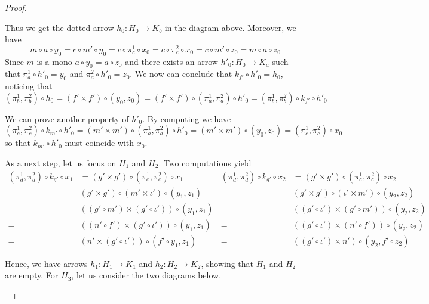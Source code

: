 \documentclass[a4paper,UKenglish,cleveref,pdftex,thm-restate,numberwithinsect]{lipics-v2021}
\begin{document}
\begin{proof}
\begin{enumerate}
 Thus we get the dotted arrow $h_0\colon H_0\to K_b$ in the diagram above. Moreover, we have
 \[m\circ a\circ y_0=c\circ m'\circ y_0=c\circ \pi^1_c\circ x_0=c\circ \pi^2_c\circ x_0=c\circ m'\circ z_0=m\circ a \circ z_0\]
 Since $m$ is a mono $a\circ y_0=a\circ z_0$ and there exists an arrow $h'_0\colon H_0\to K_a$ such that $\pi^1_a\circ h'_0=y_0$ and $\pi^2_a\circ h'_0=z_0$. 
 We now can conclude that $k_{f'}\circ h'_0=h_0$, noticing that
 \[(\pi^1_b, \pi^2_b)\circ h_0=(f'\times f')\circ (y_0, z_0)=(f'\times f')\circ (\pi^1_a, \pi^2_a)\circ h'_0=(\pi^1_b, \pi^2_b)\circ k_{f'}\circ h'_0\]

We can prove another property of $h'_0$. By computing we have
\[(\pi^1_c, \pi^2_c)\circ k_{m'}\circ h'_0=(m'\times m')\circ (\pi^1_a, \pi^2_a)\circ h'_0=(m'\times m')\circ (y_0, z_0)=(\pi^1_c, \pi^2_c)\circ x_0\]
so that $k_{m'}\circ h'_0$ must coincide with $x_0$.

As a next step, let us focus on $H_1$ and $H_2$. Two computations yield \small
 \[\begin{split}
(\pi^1_d, \pi^2_d)\circ k_{g'}\circ x_1&=(g'\times g')\circ (\pi^1_c, \pi^2_c)\circ x_1\\=&(g'\times g')\circ (m'\times \iota')\circ (y_1, z_1)\\=&((g'\circ m') \times (g'\circ \iota'))\circ (y_1, z_1)\\=&((n'\circ f') \times (g'\circ \iota'))\circ (y_1, z_1)\\=&(n'\times  (g'\circ \iota'))\circ (f'\circ y_1, z_1)
 \end{split} \hspace{1pt} \begin{split}
 (\pi^1_d, \pi^2_d)\circ k_{g'}\circ x_2&=(g'\times g')\circ (\pi^1_c, \pi^2_c)\circ x_2\\=&(g'\times g')\circ ( \iota' \times m')\circ (y_2, z_2)\\=&((g'\circ \iota') \times (g'\circ m'))\circ (y_2, z_2)\\=&( (g'\circ \iota') \times (n'\circ f'))\circ (y_2, z_2)\\=&((g'\circ \iota') \times n')\circ (y_2, f'\circ z_2)
 \end{split} \]
\normalsize

 Hence, we have arrows $h_1\colon H_1\to K_1$ and $h_2\colon H_2\to K_2$, showing that $H_1$ and $H_2$ are empty. For $H_3$, let us consider the two diagrams below.


\end{enumerate}
\end{proof}
\end{document}
